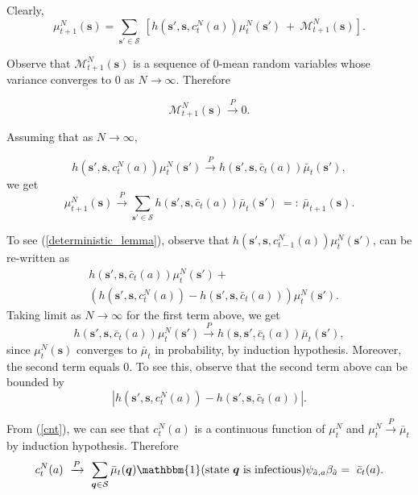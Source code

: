 \documentclass{article}
\theoremstyle{definition}
\newcommand{\abs}[1]{\left\lvert{#1}\right\rvert}
\begin{document}
Clearly,
\begin{equation}\label{eq:errorVar} \mu^N_{t+1}(\bm{s})= \sum\limits_{\bm{s'}\in\mathcal S} ~ \left[  {h}(\bm{s'},\bm{s},c^N_{t}({a})) \mu^N_{t}(\bm{s'})  ~+~ \mathcal M^N_{t+1}(\bm{s})\right].\end{equation}


Observe that $\mathcal M^N_{t+1}(\bm{s})$ is a sequence of $0$-mean random variables whose variance converges to $0$ as $N\rightarrow \infty$. Therefore

\[\mathcal M^N_{t+1}(\bm{s}) \xrightarrow{P} 0. \]



Assuming  that as $N \to \infty$, 

\begin{equation}
{h}(\bm{s'},\bm{s},c^N_{t}({a}))\mu^N_{t}(\bm{s'}) \xrightarrow{P} {h}(\bm{s'},\bm{s},\bar{c}_{t}({a})) \bar{\mu}_{t}(\bm{s'}),
\label{deterministic_lemma}
\end{equation}
  we get
\[ {\mu}_{t+1}^N(\bm{s}) \xrightarrow{P} \sum\limits_{\bm{s'}\in \mathcal S} {h}(\bm{s'},\bm{s},\bar{c}_{t}({a}))\bar{\mu}_{t}(\bm{s'})  ~ =: ~ \bar{\mu}_{t+1}(\bm{s}). \]
 




To see (\ref{deterministic_lemma}), observe that  ${h}(\bm{s'},\bm{s},c^N_{t-1}({a})) \mu^N_{t}(\bm{s'})$, can be re-written as
  \begin{align*}
  &{h}(\bm{s'},\bm{s},\bar{c}_{t}({a})) \mu^N_{t}(\bm{s'})+\\&  ({h}(\bm{s'},\bm{s},c^N_{t}({a}))-{h}(\bm{s'},\bm{s},\bar{c}_{t}({a}))) \mu^N_{t}(\bm{s'}).
  \end{align*}
  Taking limit as $N\rightarrow \infty$ for the first term above, we get
  $${h}(\bm{s'},\bm{s},\bar{c}_{t}({a})) \mu^N_{t}(\bm{s'})  \xrightarrow{P} {h}(\bm{s},\bm{s'},\bar{c}_{t}({a})) \bar{\mu}_{t}(\bm{s'}),$$
  since $\mu^N_{t}(\bm{s})$ converges to $\bar{\mu}_{t}$ in probability, by induction hypothesis. Moreover, the second term equals $0$. To see this, observe that the second term above can be bounded by 
  \begin{equation} \label{eqn:conv0}
      \abs{{h}(\bm{s'},\bm{s},c^N_{t}({a}))-{h}(\bm{s'},\bm{s},\bar{c}_{t}({a}))}.
  \end{equation}
  
  From (\ref{cnt}), we can see that $c^N_{t}({a})$ is a continuous function of $\mu^N_{t}$ and $\mu^N_{t} \xrightarrow{P} \bar{\mu}_{t}$ by induction hypothesis. Therefore $$c^N_{t}({a})~\xrightarrow{P}  ~ \sum\limits_{\bm{q} \in \mathcal S} \bar{\mu}_{t}(\bm q)\mathbbm{1}(\text{state }\bm{q} \text{ is infectious}) \psi_{\tilde{a},{a}} \beta_{\tilde{a}}  = ~\bar{c}_{t}({a}). $$
  
\end{document}
